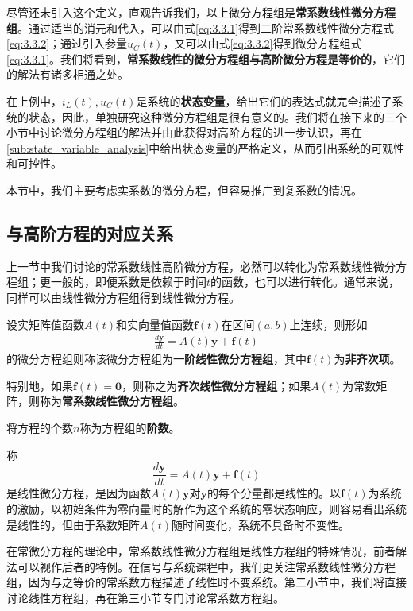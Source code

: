 尽管还未引入这个定义，直观告诉我们，以上微分方程组是\textbf{常系数线性微分方程组}。通过适当的消元和代入，可以由式\ref{eq:3.3.1}得到二阶常系数线性微分方程式\ref{eq:3.3.2}；通过引入参量$u_C(t)$，又可以由式\ref{eq:3.3.2}得到微分方程组式\ref{eq:3.3.1}。我们将看到，\textbf{常系数线性的微分方程组与高阶微分方程是等价的}，它们的解法有诸多相通之处。

在上例中，$i_L(t),u_C(t)$是系统的\textbf{状态变量}，给出它们的表达式就完全描述了系统的状态，因此，单独研究这种微分方程组是很有意义的。我们将在接下来的三个小节中讨论微分方程组的解法并由此获得对高阶方程的进一步认识，再在\ref{sub:state_variable_analysis}中给出状态变量的严格定义，从而引出系统的可观性和可控性。

本节中，我们主要考虑实系数的微分方程，但容易推广到复系数的情况。

\subsection{与高阶方程的对应关系}\label{sub:compare_to_high_order}

上一节中我们讨论的常系数线性高阶微分方程，必然可以转化为常系数线性微分方程组；更一般的，即便系数是依赖于时间$t$的函数，也可以进行转化。通常来说，同样可以由线性微分方程组得到线性微分方程。

\begin{definition}[线性微分方程组]
    设实矩阵值函数$A(t)$和实向量值函数$\mathbf{f}(t)$在区间$(a,b)$上连续，则形如\begin{align*}
    \frac{d\mathbf{y}}{dt}=A(t)\mathbf{y}+\mathbf{f}(t)
    \end{align*}
    的微分方程组则称该微分方程组为\textbf{一阶线性微分方程组}，其中$\mathbf{f}(t)$为\textbf{非齐次项}。

    特别地，如果$\mathbf{f}(t)=\mathbf{0}$，则称之为\textbf{齐次线性微分方程组}；如果$A(t)$为常数矩阵，则称为\textbf{常系数线性微分方程组}。

    将方程的个数$n$称为方程组的\textbf{阶数}。
\end{definition}

称
$$\frac{d\mathbf{y}}{dt}=A(t)\mathbf{y}+\mathbf{f}(t)$$
是线性微分方程，是因为函数$A(t)\mathbf{y}$对$\mathbf{y}$的每个分量都是线性的。以$\mathbf{f}(t)$为系统的激励，以初始条件为零向量时的解作为这个系统的零状态响应，则容易看出系统是线性的，但由于系数矩阵$A(t)$随时间变化，系统不具备时不变性。

在常微分方程的理论中，常系数线性微分方程组是线性方程组的特殊情况，前者解法可以视作后者的特例。在信号与系统课程中，我们更关注常系数线性微分方程组，因为与之等价的常系数方程描述了线性时不变系统。第二小节中，我们将直接讨论线性方程组，再在第三小节专门讨论常系数方程组。

